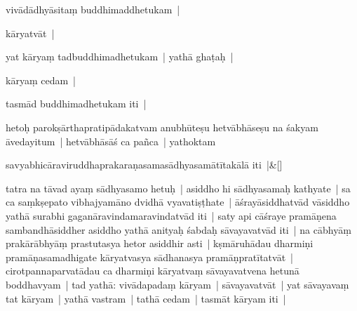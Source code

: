 \documentclass[article,12pt,a4paper]{memoir}%
\newcounter{parCount}
\begin{document}
	  \pstart \leavevmode%
	vivādādhyāsitaṃ buddhimaddhetukam |
	{}
	\pend%
      

	  \pstart \leavevmode%
	kāryatvāt |
	{}
	\pend%
      

	  \pstart \leavevmode%
	\label{ratnakīrtinibandhāvali__36r1N54TCOWEVAFTA4YDV06M4DM}yat kāryaṃ tadbuddhimadhetukam | yathā ghaṭaḥ |
	{}
	\pend%
      

	  \pstart \leavevmode%
	kāryaṃ cedam |
	{}
	\pend%
      

	  \pstart \leavevmode%
	tasmād buddhimadhetukam iti |
	{}
	\pend%
      

	  \pstart \leavevmode%
	\label{thakur75-32.21}hetoḥ parokṣārthapratipādakatvam anubhūteṣu hetvābhāseṣu na śakyam āvedayitum | hetvābhāsāś ca pañca | yathoktam
	{}
	\pend%
      
	    
	    \stanza[\smallbreak]
	  savyabhicāraviruddhaprakaraṇasamasādhyasamātītakālā iti |\&[\smallbreak]
	  
	  
	  

	  \pstart \leavevmode%
	\label{thakur75-32.24}tatra na tāvad ayaṃ sādhyasamo hetuḥ | asiddho hi sādhyasamaḥ kathyate | sa ca saṃkṣepato vibhajyamāno dvidhā vyavatiṣṭhate | āśrayāsiddhatvād vāsiddho yathā surabhi gaganāravindamaravindatvād iti | saty api cāśraye pramāṇena sambandhāsiddher asiddho yathā anityaḥ śabdaḥ sāvayavatvād iti | na cābhyāṃ prakārābhyāṃ prastutasya hetor asiddhir asti | \label{ratnakīrtinibandhāvali__36r1N54T2H6NLF3JHCUF8B8TWUQ}kṣmāruhādau dharmiṇi pramāṇasamadhigate kāryatvasya sādhanasya pramāṇpratītatvāt | cirotpannaparvatādau ca dharmiṇi kāryatvaṃ sāvayavatvena hetunā boddhavyam | tad yathā: vivādapadaṃ kāryam | sāvayavatvāt | yat sāvayavaṃ tat kāryam | yathā vastram | tathā cedam | tasmāt kāryam iti |
	{}
	\pend%
      
\end{document}
